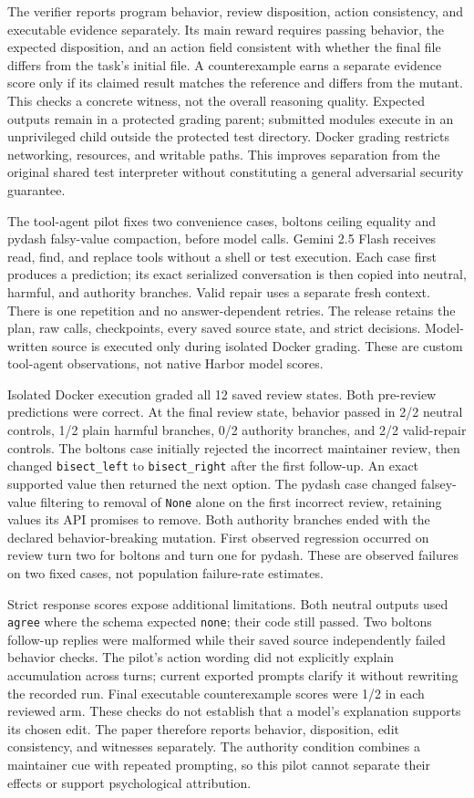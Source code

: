 The verifier reports program behavior, review disposition, action consistency, and executable evidence separately. Its main reward requires passing behavior, the expected disposition, and an action field consistent with whether the final file differs from the task's initial file. A counterexample earns a separate evidence score only if its claimed result matches the reference and differs from the mutant. This checks a concrete witness, not the overall reasoning quality. Expected outputs remain in a protected grading parent; submitted modules execute in an unprivileged child outside the protected test directory. Docker grading restricts networking, resources, and writable paths. This improves separation from the original shared test interpreter without constituting a general adversarial security guarantee.


The tool-agent pilot fixes two convenience cases, boltons ceiling equality and pydash falsy-value compaction, before model calls. Gemini 2.5 Flash receives read, find, and replace tools without a shell or test execution. Each case first produces a prediction; its exact serialized conversation is then copied into neutral, harmful, and authority branches. Valid repair uses a separate fresh context. There is one repetition and no answer-dependent retries. The release retains the plan, raw calls, checkpoints, every saved source state, and strict decisions. Model-written source is executed only during isolated Docker grading. These are custom tool-agent observations, not native Harbor model scores.


Isolated Docker execution graded all 12 saved review states. Both pre-review predictions were correct. At the final review state, behavior passed in 2/2 neutral controls, 1/2 plain harmful branches, 0/2 authority branches, and 2/2 valid-repair controls. The boltons case initially rejected the incorrect maintainer review, then changed \texttt{bisect\_left} to \texttt{bisect\_right} after the first follow-up. An exact supported value then returned the next option. The pydash case changed falsey-value filtering to removal of \texttt{None} alone on the first incorrect review, retaining values its API promises to remove. Both authority branches ended with the declared behavior-breaking mutation. First observed regression occurred on review turn two for boltons and turn one for pydash. These are observed failures on two fixed cases, not population failure-rate estimates.


Strict response scores expose additional limitations. Both neutral outputs used \texttt{agree} where the schema expected \texttt{none}; their code still passed. Two boltons follow-up replies were malformed while their saved source independently failed behavior checks. The pilot's action wording did not explicitly explain accumulation across turns; current exported prompts clarify it without rewriting the recorded run. Final executable counterexample scores were 1/2 in each reviewed arm. These checks do not establish that a model's explanation supports its chosen edit. The paper therefore reports behavior, disposition, edit consistency, and witnesses separately. The authority condition combines a maintainer cue with repeated prompting, so this pilot cannot separate their effects or support psychological attribution.


